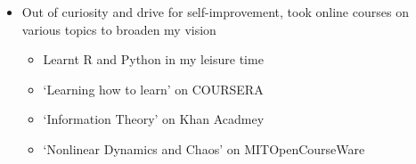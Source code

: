 \documentclass[a4paper, 12pt]{article}
\begin{document}
\begin{itemize}
    \item Out of curiosity and drive for self-improvement, took online courses on various topics to broaden my vision
    \begin{itemize}
        \setlength\itemsep{0em}
        \item Learnt R and Python in my leisure time
        \item `Learning how to learn' on COURSERA
        \item `Information Theory' on Khan Acadmey
        \item `Nonlinear Dynamics and Chaos' on MITOpenCourseWare
    \end{itemize}
\end{itemize}


% 
% 
\end{document}
